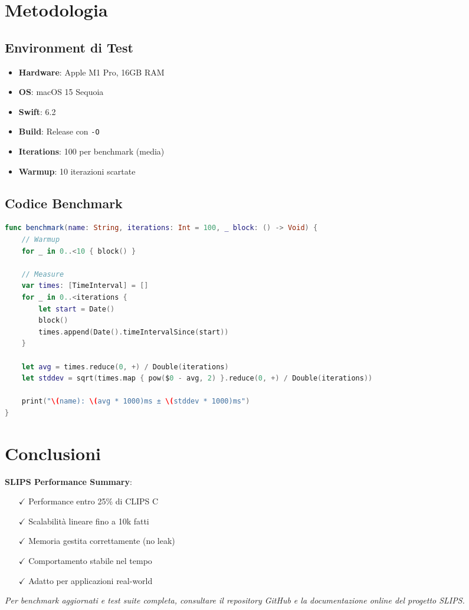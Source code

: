 \section{Metodologia}

\subsection{Environment di Test}

\begin{itemize}
\item \textbf{Hardware}: Apple M1 Pro, 16GB RAM
\item \textbf{OS}: macOS 15 Sequoia
\item \textbf{Swift}: 6.2
\item \textbf{Build}: Release con \texttt{-O}
\item \textbf{Iterations}: 100 per benchmark (media)
\item \textbf{Warmup}: 10 iterazioni scartate
\end{itemize}

\subsection{Codice Benchmark}

\begin{lstlisting}[language=Swift]
func benchmark(name: String, iterations: Int = 100, _ block: () -> Void) {
    // Warmup
    for _ in 0..<10 { block() }
    
    // Measure
    var times: [TimeInterval] = []
    for _ in 0..<iterations {
        let start = Date()
        block()
        times.append(Date().timeIntervalSince(start))
    }
    
    let avg = times.reduce(0, +) / Double(iterations)
    let stddev = sqrt(times.map { pow($0 - avg, 2) }.reduce(0, +) / Double(iterations))
    
    print("\(name): \(avg * 1000)ms ± \(stddev * 1000)ms")
}
\end{lstlisting}

\section{Conclusioni}

\textbf{SLIPS Performance Summary}:

\begin{successbox}
\begin{itemize}
\item[$\checkmark$] Performance entro 25\% di CLIPS C
\item[$\checkmark$] Scalabilità lineare fino a 10k fatti
\item[$\checkmark$] Memoria gestita correttamente (no leak)
\item[$\checkmark$] Comportamento stabile nel tempo
\item[$\checkmark$] Adatto per applicazioni real-world
\end{itemize}
\end{successbox}

\textit{Per benchmark aggiornati e test suite completa, consultare il repository GitHub e la documentazione online del progetto SLIPS.}

